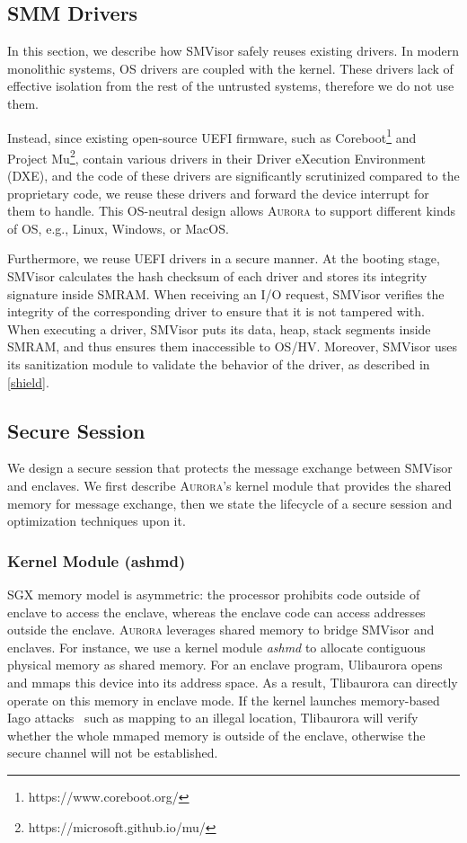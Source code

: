 \subsection{SMM Drivers}\label{driver}
In this section, we describe how SMVisor safely reuses existing drivers. In modern monolithic systems, OS drivers are coupled with the kernel. These drivers lack of effective isolation from the rest of the untrusted systems, therefore we do not use them.

Instead, since existing open-source UEFI firmware, such as Coreboot\footnote{https://www.coreboot.org/} and Project Mu\footnote{https://microsoft.github.io/mu/}, contain various drivers in their Driver eXecution Environment (DXE), and the code of these drivers are significantly scrutinized compared to the proprietary code, we reuse these drivers and forward the device interrupt for them to handle. This OS-neutral design allows \textsc{Aurora} to support different kinds of OS, e.g., Linux, Windows, or MacOS.

Furthermore, we reuse UEFI drivers in a secure manner. At the booting stage, SMVisor calculates the hash checksum of each driver and stores its integrity signature inside SMRAM. When receiving an I/O request, SMVisor verifies the integrity of the corresponding driver to ensure that it is not tampered with. When executing a driver, SMVisor puts its data, heap, stack segments inside SMRAM, and thus ensures them inaccessible to OS/HV. Moreover, SMVisor uses its sanitization module to validate the behavior of the driver, as described in \autoref{shield}.

\subsection{Secure Session}\label{secure_session}

We design a secure session that protects the message exchange between SMVisor and enclaves. We first describe \textsc{Aurora}'s kernel module that provides the shared memory for message exchange, then we state the lifecycle of a secure session and optimization techniques upon it.

\subsubsection{Kernel Module (ashmd)}
SGX memory model is asymmetric: the processor prohibits code outside of enclave to access the enclave, whereas the enclave code can access addresses outside the enclave. \textsc{Aurora} leverages shared memory to bridge SMVisor and enclaves. For instance, we use a kernel module \emph{ashmd} to allocate contiguous physical memory as shared memory. For an enclave program, Ulibaurora opens and mmaps this device into its  address space. As a result, Tlibaurora can directly operate on this memory in enclave mode. If the kernel launches memory-based Iago attacks~\cite{DBLP:conf/asplos/CheckowayS13} such as mapping to an illegal location, Tlibaurora will verify whether the whole mmaped memory is outside of the enclave, otherwise the secure channel will not be established. 

